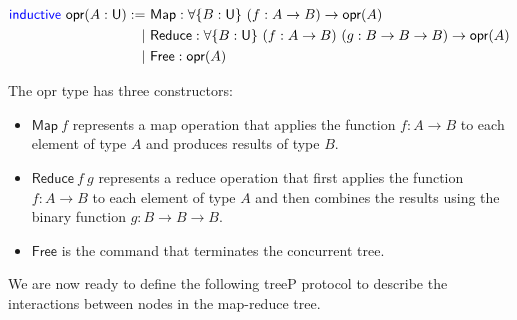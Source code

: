 \vspace{-1em}
\begingroup
\small
\addtolength{\jot}{-0.25em}
\begin{align*}
  \textsf{\color{blue}inductive}\ \textsf{opr}(A : \textsf{U}) :=\ &\textsf{Map}   : \forall \{B : \textsf{U}\}\ (f : A \rightarrow B) \rightarrow \textsf{opr}(A) \\
  \mid\ &\textsf{Reduce}: \forall \{B : \textsf{U}\}\ (f : A \rightarrow B)\ (g : B \rightarrow B \rightarrow B) \rightarrow \textsf{opr}(A) \\
  \mid\ &\textsf{Free}  : \textsf{opr}(A)
\end{align*}
\endgroup

The \textsf{opr} type has three constructors:
\begin{itemize}
  \item $\textsf{Map}\ f$ represents a map operation that applies the function
        $f : A \rightarrow B$ to each element of type $A$ and produces results of type $B$.
  \item $\textsf{Reduce}\ f\ g$ represents a reduce operation that first
        applies the function $f : A \rightarrow B$ to each element of type $A$ and then
        combines the results using the binary function $g : B \rightarrow B \rightarrow B$.
  \item $\textsf{Free}$ is the command that terminates the concurrent tree.
\end{itemize}

We are now ready to define the following \textsf{treeP} protocol 
to describe the interactions between nodes in the map-reduce tree.

